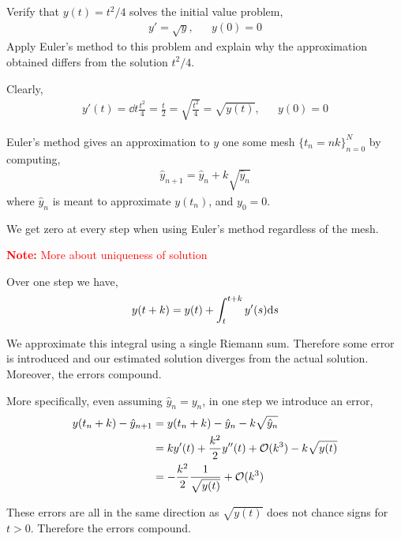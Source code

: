\documentclass[10pt]{article}
\newcommand{\note}[1]{\textcolor{red}{\textbf{Note:} #1}}
\begin{document}
\begin{problem}
Verify that \( y(t) = t^2/4 \) solves the initial value problem,
\begin{align*}
    y' = \sqrt{y}, && y(0) = 0
\end{align*}
Apply Euler’s method to this problem and explain why the approximation obtained differs
from the solution \( t^2/4 \).
\end{problem}

\begin{solution}[Solution]
Clearly,
\begin{align*}
    y'(t) = \dd{}{t} \frac{t^2}{4} = \frac{t}{2} = \sqrt{\frac{t^2}{4}} = \sqrt{y(t)}, && y(0) = 0
\end{align*}

Euler's method gives an approximation to \( y \) one some mesh \( \{ t_n = n k \}_{n=0}^{N}  \) by computing,
\begin{align*}
    \hat{y}_{n+1} = \hat{y}_n + k \sqrt{\hat{y}_n}
\end{align*}
where \( \hat{y}_n  \) is meant to approximate \( y(t_n) \), and \( y_0 = 0 \).

We get zero at every step when using Euler's method regardless of the mesh.

\note{More about uniqueness of solution}

Over one step we have,
\begin{align*}
    y(t+k) = y(t) + \int_t^{t+k} y'(s)\mathrm{d} s
\end{align*}

We approximate this integral using a single Riemann sum. Therefore some error is introduced and our estimated solution diverges from the actual solution. Moreover, the errors compound.

    More specifically, even assuming \( \hat{y}_n = y_n \), in one step we introduce an error,
\begin{align*}
    y(t_n+k) - \hat{y}_{n+1} &=  y(t_n+k) - \hat{y}_n - k\sqrt{\hat{y}_n} 
    \\&= k y'(t) + \frac{k^2}{2}y''(t) + \mathcal{O}(k^3) - k\sqrt{y(t)} 
    \\&= -\frac{k^2}{2} \frac{1}{\sqrt{y(t)}} + \mathcal{O}(k^3)
\end{align*}

    These errors are all in the same direction as \( \sqrt{y(t)} \) does not chance signs for \( t>0 \). Therefore the errors compound.

\end{solution}
\end{document}
